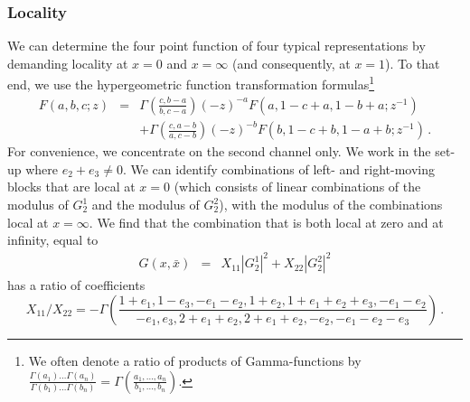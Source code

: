 \documentclass[12pt]{article}
\numberwithin{equation}{section}
\numberwithin{equation}{section}
\numberwithin{table}{section}\setlength{\multlinegap}{25pt}
\begin{document}
\subsubsection{Locality}
We can determine the four point function of four typical representations by demanding locality at $x=0$ and $x=\infty$
(and consequently, at $x=1$). To that end, we use the hypergeometric function transformation formulas\footnote{We often denote a ratio of products of Gamma-functions
 by $\frac{\Gamma(a_1)\dots \Gamma(a_n)}{\Gamma(b_1)\dots \Gamma(b_n)}=\Gamma(\frac{a_1,\dots,a_n}{b_1,\dots,b_n})$.}
\begin{eqnarray}
F(a,b,c;z) &=&
\Gamma(\frac{c,b-a}{b,c-a}) (-z)^{-a}
F(a,1-c+a,1-b+a;z^{-1})
\nonumber \\
& & 
+
\Gamma(\frac{c,a-b}{a,c-b}) (-z)^{-b}
F(b,1-c+b,1-a+b;z^{-1}) \, .
\end{eqnarray}
For convenience, we concentrate on the second channel only. We work in the set-up where $e_2 + e_3 \neq 0$.
We can identify combinations of left- and right-moving blocks that are local at $x=0$ (which 
consists of linear combinations of the modulus of $G_2^1$ and the modulus of $G_2^2$), with the
modulus of the combinations local at $x=\infty$.
We find that the combination that is both local at zero and at infinity, equal to
\begin{eqnarray}
G(x,\bar{x}) &=& X_{11} |G_2^1|^2 + X_{22} |G_2^2|^2
\end{eqnarray}
has a ratio of coefficients
\begin{equation}
X_{11}/X_{22} = - %
\Gamma(\frac{1+e_1,1-e_3,-e_1-e_2,1+e_2,1+e_1+e_2+e_3,-e_1-e_2}{-e_1,e_3,2+e_1+e_2,2+e_1+e_2,-e_2,-e_1-e_2-e_3}) \, .
\label{localityconstraint}
\end{equation}
\end{document}
